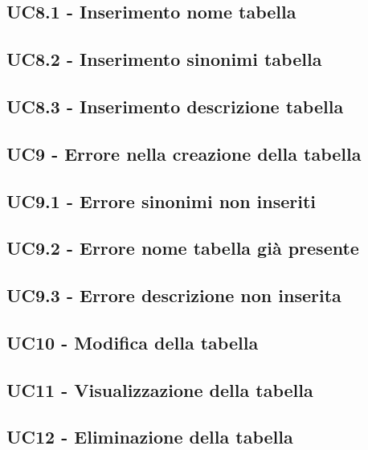 \documentclass[5pt]{article}
\begin{document}
\subsection{UC8.1 - Inserimento nome tabella}
\label{sec:UC8.1}

\subsection{UC8.2 - Inserimento sinonimi tabella}
\label{sec:UC8.2}

\subsection{UC8.3 - Inserimento descrizione tabella}
\label{sec:UC8.3}

\subsection{UC9 - Errore nella creazione della tabella}
\label{sec:UC9}

\subsection{UC9.1 - Errore sinonimi non inseriti}
\label{sec:UC9.1}

\subsection{UC9.2 - Errore nome tabella già presente}
\label{sec:UC9.2}

\subsection{UC9.3 - Errore descrizione non inserita}
\label{sec:UC9.3}

\subsection{UC10 - Modifica della tabella}
\label{sec:UC10}

\subsection{UC11 - Visualizzazione della tabella}
\label{sec:UC11}

\subsection{UC12 - Eliminazione della tabella}
\label{sec:UC12}
\end{document}

